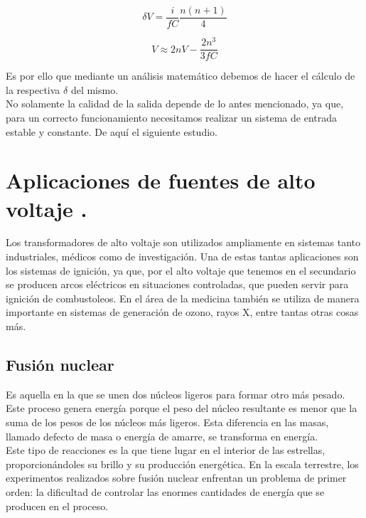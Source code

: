 \begin{equation}
\delta V=\frac{i}{fC}\frac{n(n+1)}{4}
\end{equation}

\begin{equation}
V\approx 2nV-\frac{2n^{3}}{3fC}
\end{equation}

Es por ello que mediante un análisis matemático debemos de hacer el cálculo de la respectiva $\delta$ del mismo.\\
No solamente la calidad de la salida depende de lo antes mencionado, ya que, para un correcto funcionamiento necesitamos realizar un sistema de entrada estable y constante. De aquí el siguiente estudio.
\newpage
\section{Aplicaciones de fuentes de alto voltaje .}

Los transformadores de alto voltaje son utilizados ampliamente en sistemas tanto industriales, médicos como de investigación. Una de estas tantas aplicaciones son los sistemas de ignición, ya que, por el alto voltaje que tenemos en el secundario se producen arcos eléctricos en situaciones controladas, que pueden servir para ignición de combustoleos. En el área de la medicina también se utiliza de manera importante en sistemas de generación de ozono, rayos X, entre tantas otras cosas más.  \\
\subsection{Fusión nuclear}

Es aquella en la que se unen dos núcleos ligeros para formar otro más pesado. Este proceso genera energía porque el peso del núcleo resultante es menor que la suma de los pesos de los núcleos más ligeros. Esta diferencia en las masas, llamado defecto de masa o energía de amarre, se transforma en energía.\\

Este tipo de reacciones es la que tiene lugar en el interior de las estrellas, proporcionándoles su brillo y su producción energética. En la escala terrestre, los experimentos realizados sobre fusión nuclear enfrentan un problema de primer orden: la dificultad de controlar las enormes cantidades de energía que se producen en el proceso.


